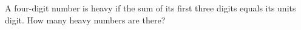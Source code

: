 A four-digit number is heavy if the sum of its first three digits equals its units digit. How many heavy numbers are there?
